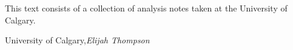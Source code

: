 %
%

\preface

This text consists of a collection of analysis notes taken at the University of Calgary. 


\vspace{\baselineskip}
\begin{flushright}\noindent
University of Calgary,\hfill {\it Elijah  Thompson}\\
\end{flushright}


